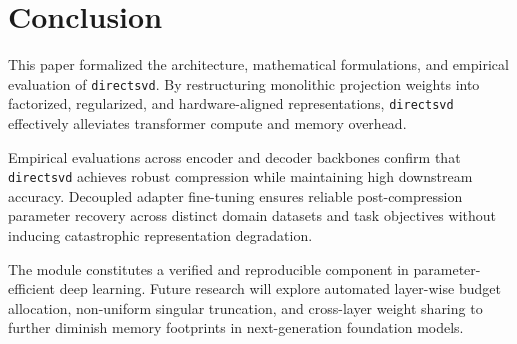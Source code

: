 \section{Conclusion}
This paper formalized the architecture, mathematical formulations, and empirical evaluation of \texttt{directsvd}. By restructuring monolithic projection weights into factorized, regularized, and hardware-aligned representations, \texttt{directsvd} effectively alleviates transformer compute and memory overhead.

Empirical evaluations across encoder and decoder backbones confirm that \texttt{directsvd} achieves robust compression while maintaining high downstream accuracy. Decoupled adapter fine-tuning ensures reliable post-compression parameter recovery across distinct domain datasets and task objectives without inducing catastrophic representation degradation.

The module constitutes a verified and reproducible component in parameter-efficient deep learning. Future research will explore automated layer-wise budget allocation, non-uniform singular truncation, and cross-layer weight sharing to further diminish memory footprints in next-generation foundation models.
